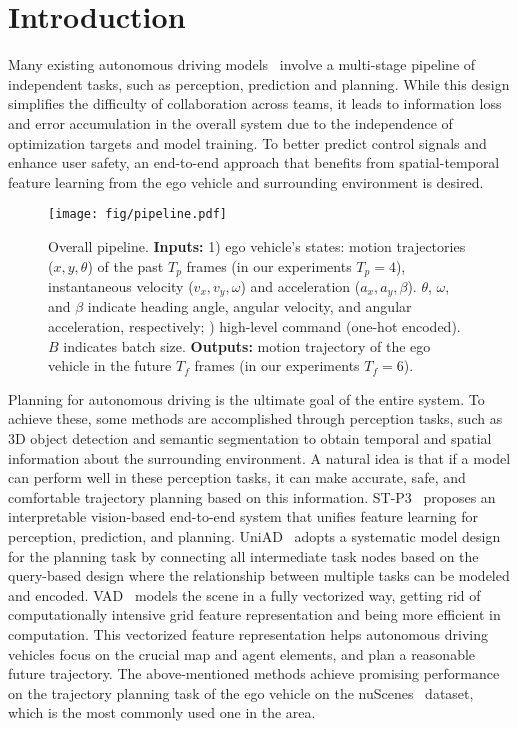 \documentclass[10pt,twocolumn,letterpaper]{article}
\begin{document}
\section{Introduction}
\label{sec:intro}
Many existing autonomous driving models~\cite{liang2020pnpnet,luo2018fast,sadat2020perceive} involve a multi-stage pipeline of independent tasks, such as perception\cite{Xiong2023CAPE,li2022bevformer}, prediction\cite{fiery2021,densetnt} and planning\cite{Chitta2022PAMI,chen2021}. While this design simplifies the difficulty of collaboration across teams, it leads to information loss and error accumulation in the overall system due to the independence of optimization targets and model training. To better predict control signals and enhance user safety, an end-to-end approach that benefits from spatial-temporal feature learning from the ego vehicle and surrounding environment is desired.

\begin{figure*}[ht]
    \centering
    \small
    \texttt{[image: fig/pipeline.pdf]}
    \caption{
    Overall pipeline. 
    \textbf{Inputs:}
    1) ego vehicle's states: 
    motion trajectories ($x,y,\theta$) of the past $T_p$ frames (in our experiments $T_p=4$), 
    instantaneous velocity ($v_x,v_y,\omega$)
    and acceleration ($a_x,a_y,\beta$). $\theta$, $\omega$, and $\beta$ indicate heading angle, angular velocity, and angular acceleration, respectively;  
    ) high-level command (one-hot encoded). $B$ indicates batch size.
    \textbf{Outputs:}
    motion trajectory of the ego vehicle in the 
    future $T_f$ frames (in our experiments $T_f=6$).
    }
    \label{fig:Method}
\end{figure*}


Planning for autonomous driving is the ultimate goal of the entire system. To achieve these, some methods are accomplished through perception tasks, such as 3D object detection and semantic segmentation to obtain temporal and spatial information about the surrounding environment. 
A natural idea is that if a model can perform well in these perception tasks, it can make accurate, safe, and comfortable trajectory planning based on this information. ST-P3~\cite{hu2022st} proposes an interpretable vision-based end-to-end system that unifies feature learning for perception, prediction, and planning. 
UniAD~\cite{hu2022goal} adopts a systematic model design for the planning task by connecting all intermediate task nodes based on the query-based design where the relationship between multiple tasks can be modeled and encoded. VAD~\cite{jiang2023vad} models the scene in a fully vectorized way, getting rid of computationally intensive grid feature representation and being more efficient in computation. 
This vectorized feature representation helps autonomous driving vehicles focus on the crucial map and agent elements, and plan a reasonable future trajectory.
The above-mentioned methods 
achieve promising performance on the trajectory planning task of the ego vehicle on the nuScenes~\cite{caesar2020nuscenes} dataset, which is the most commonly used one
in the area.
\end{document}
